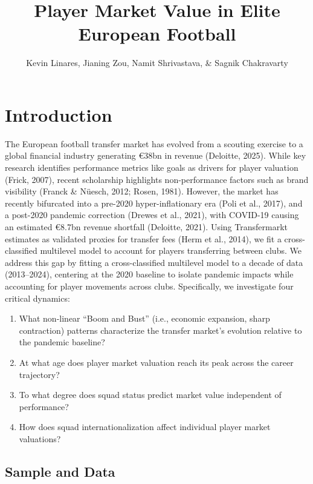 \documentclass[
  12pt,
]{article}
\title{Player Market Value in Elite European Football}
\author{Kevin Linares, Jianing Zou, Namit Shrivastava, \& Sagnik
Chakravarty}
\date{}
\providecommand{\tightlist}{%
  \setlength{\itemsep}{0pt}\setlength{\parskip}{0pt}}
\begin{document}
\maketitle


\vspace{-2cm}

\section{Introduction}\label{introduction}

The European football transfer market has evolved from a scouting
exercise to a global financial industry generating €38bn in revenue
(Deloitte, 2025). While key research identifies performance metrics like
goals as drivers for player valuation (Frick, 2007), recent scholarship
highlights non-performance factors such as brand visibility (Franck \&
Nüesch, 2012; Rosen, 1981). However, the market has recently bifurcated
into a pre-2020 hyper-inflationary era (Poli et al., 2017), and a
post-2020 pandemic correction (Drewes et al., 2021), with COVID-19
causing an estimated €8.7bn revenue shortfall (Deloitte, 2021). Using
Transfermarkt estimates as validated proxies for transfer fees (Herm et
al., 2014), we fit a cross-classified multilevel model to account for
players transferring between clubs. We address this gap by fitting a
cross-classified multilevel model to a decade of data (2013--2024),
centering at the 2020 baseline to isolate pandemic impacts while
accounting for player movements across clubs. Specifically, we
investigate four critical dynamics:

\begin{enumerate}
\def\labelenumi{\arabic{enumi}.}
\tightlist
\item
  What non-linear ``Boom and Bust'' (i.e., economic expansion, sharp
  contraction) patterns characterize the transfer market's evolution
  relative to the pandemic baseline?
\item
  At what age does player market valuation reach its peak across the
  career trajectory?
\item
  To what degree does squad status predict market value independent of
  performance?
\item
  How does squad internationalization affect individual player market
  valuations?
\end{enumerate}

\subsection{Sample and Data}\label{sample-and-data}
\end{document}

